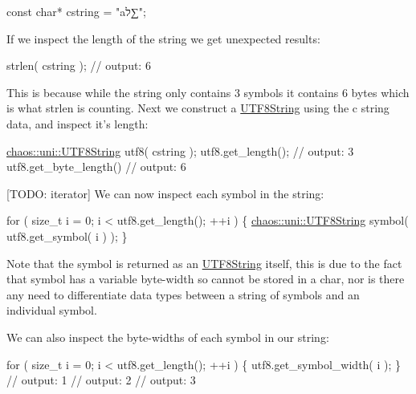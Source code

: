 \begin{DoxyCode}
\textcolor{keyword}{const} \textcolor{keywordtype}{char}* cstring = \textcolor{stringliteral}{"aל∑"};
\end{DoxyCode}


If we inspect the length of the string we get unexpected results\-:


\begin{DoxyCode}
strlen( cstring );
\textcolor{comment}{// output: 6}
\end{DoxyCode}


This is because while the string only contains 3 symbols it contains 6 bytes which is what {\ttfamily strlen} is counting. Next we construct a \hyperlink{classchaos_1_1uni_1_1_u_t_f8_string}{U\-T\-F8\-String} using the c string data, and inspect it's length\-:


\begin{DoxyCode}
\hyperlink{classchaos_1_1uni_1_1_u_t_f8_string}{chaos::uni::UTF8String} utf8( cstring );
utf8.get\_length();
\textcolor{comment}{// output: 3}
utf8.get\_byte\_length()
\textcolor{comment}{// output: 6}
\end{DoxyCode}


\mbox{[}T\-O\-D\-O\-: iterator\mbox{]} We can now inspect each symbol in the string\-:


\begin{DoxyCode}
\textcolor{keywordflow}{for} ( \textcolor{keywordtype}{size\_t} i = 0; i < utf8.get\_length(); ++i )
\{
    \hyperlink{classchaos_1_1uni_1_1_u_t_f8_string}{chaos::uni::UTF8String} symbol( utf8.get\_symbol( i ) );
\}
\end{DoxyCode}


Note that the symbol is returned as an \hyperlink{classchaos_1_1uni_1_1_u_t_f8_string}{U\-T\-F8\-String} itself, this is due to the fact that symbol has a variable byte-\/width so cannot be stored in a {\ttfamily char}, nor is there any need to differentiate data types between a string of symbols and an individual symbol.

We can also inspect the byte-\/widths of each symbol in our string\-:


\begin{DoxyCode}
\textcolor{keywordflow}{for} ( \textcolor{keywordtype}{size\_t} i = 0; i < utf8.get\_length(); ++i )
\{
    utf8.get\_symbol\_width( i );
\}
\textcolor{comment}{// output: 1}
\textcolor{comment}{// output: 2}
\textcolor{comment}{// output: 3}
\end{DoxyCode}


